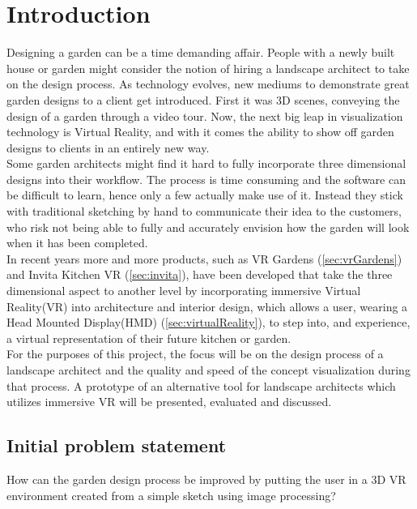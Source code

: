 \chapter{Introduction}
	Designing a garden can be a time demanding affair. People with a newly built house or garden might consider the notion of hiring a landscape architect to take on the design process. As technology evolves, new mediums to demonstrate great garden designs to a client get introduced\cite{landscapeArchitectureDigiTech}. First it was 3D scenes, conveying the design of a garden through a video tour. Now, the next big leap in visualization technology is Virtual Reality\cite{VRS}, and with it comes the ability to show off garden designs to clients in an entirely new way.\\
	
	Some garden architects might find it hard to fully incorporate three dimensional designs into their workflow. The process is time consuming and the software can be difficult to learn, hence only a few actually make use of it. Instead they stick with traditional sketching by hand to communicate their idea to the customers, who risk not being able to fully and accurately envision how the garden will look when it has been completed.\\
	
	In recent years more and more products, such as VR Gardens (\autoref{sec:vrGardens}) and Invita Kitchen VR (\autoref{sec:invita}), have been developed that take the three dimensional aspect to another level by incorporating immersive Virtual Reality(VR) into architecture and interior design, which allows a user, wearing a Head Mounted Display(HMD) (\autoref{sec:virtualReality}), to step into, and experience, a virtual representation of their future kitchen or garden.\\
	
	For the purposes of this project, the focus will be on the design process of a landscape architect and the quality and speed of the concept visualization during that process. A prototype of an alternative tool for landscape architects which utilizes immersive VR will be presented, evaluated and discussed.
	
	
	\section{Initial problem statement}
	How can the garden design process be improved by putting the user in a 3D VR environment created from a simple sketch using image processing?
	